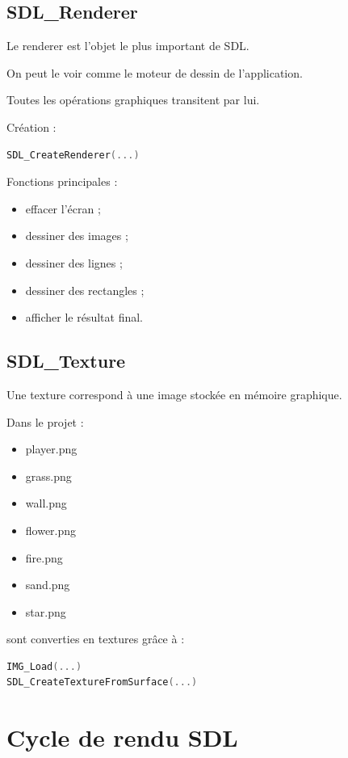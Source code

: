 \documentclass[a4paper,11pt]{article}
\begin{document}
\subsection{SDL\_Renderer}

Le renderer est l'objet le plus important de SDL.

On peut le voir comme le moteur de dessin de l'application.

Toutes les opérations graphiques transitent par lui.

Création :

\begin{lstlisting}[language=C]
SDL_CreateRenderer(...)
\end{lstlisting}

Fonctions principales :

\begin{itemize}
    \item effacer l'écran ;
    \item dessiner des images ;
    \item dessiner des lignes ;
    \item dessiner des rectangles ;
    \item afficher le résultat final.
\end{itemize}

\subsection{SDL\_Texture}

Une texture correspond à une image stockée en mémoire graphique.

Dans le projet :

\begin{itemize}
    \item player.png
    \item grass.png
    \item wall.png
    \item flower.png
    \item fire.png
    \item sand.png
    \item star.png
\end{itemize}

sont converties en textures grâce à :

\begin{lstlisting}[language=C]
IMG_Load(...)
SDL_CreateTextureFromSurface(...)
\end{lstlisting}

\section{Cycle de rendu SDL}
\end{document}
